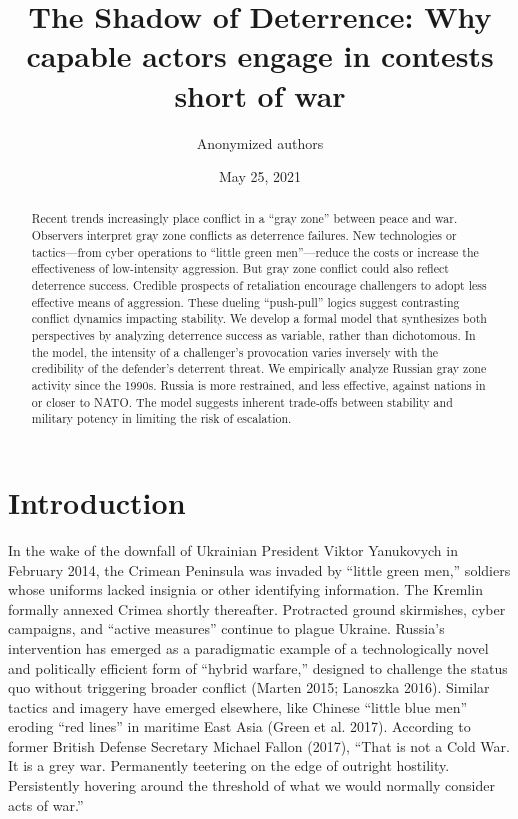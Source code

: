 \documentclass[
]{article}
\title{\singlespacing The Shadow of Deterrence: Why capable actors engage in contests short of war}
\author{Anonymized authors}
\date{May 25, 2021}
\begin{document}
\maketitle
\begin{abstract}
\singlespacing \noindent Recent trends increasingly place conflict in a ``gray zone'' between peace and war. Observers interpret gray zone conflicts as deterrence failures. New technologies or tactics---from cyber operations to ``little green men''---reduce the costs or increase the effectiveness of low-intensity aggression. But gray zone conflict could also reflect deterrence success. Credible prospects of retaliation encourage challengers to adopt less effective means of aggression. These dueling ``push-pull'' logics suggest contrasting conflict dynamics impacting stability. We develop a formal model that synthesizes both perspectives by analyzing deterrence success as variable, rather than dichotomous. In the model, the intensity of a challenger's provocation varies inversely with the credibility of the defender's deterrent threat. We empirically analyze Russian gray zone activity since the 1990s. Russia is more restrained, and less effective, against nations in or closer to NATO. The model suggests inherent trade-offs between stability and military potency in limiting the risk of escalation.
\end{abstract}

\hypertarget{introduction}{%
\section{Introduction}\label{introduction}}

In the wake of the downfall of Ukrainian President Viktor Yanukovych in February 2014, the Crimean Peninsula was invaded by ``little green men,'' soldiers whose uniforms lacked insignia or other identifying information. The Kremlin formally annexed Crimea shortly thereafter. Protracted ground skirmishes, cyber campaigns, and ``active measures'' continue to plague Ukraine. Russia's intervention has emerged as a paradigmatic example of a technologically novel and politically efficient form of ``hybrid warfare,'' designed to challenge the status quo without triggering broader conflict (Marten 2015; Lanoszka 2016). Similar tactics and imagery have emerged elsewhere, like Chinese ``little blue men'' eroding ``red lines'' in maritime East Asia (Green et al. 2017). According to former British Defense Secretary Michael Fallon (2017), ``That is not a Cold War. It is a grey war. Permanently teetering on the edge of outright hostility. Persistently hovering around the threshold of what we would normally consider acts of war.''
\end{document}
